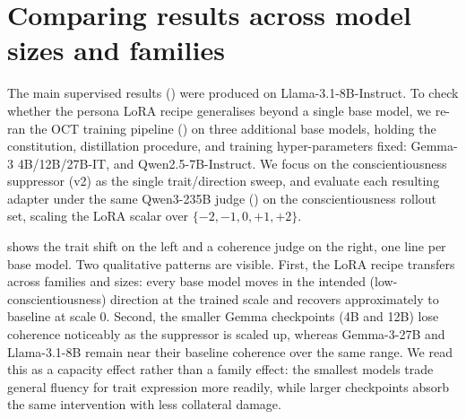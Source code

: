 \section{Comparing results across model sizes and families}\label{sec:appendix-cross-model}

The main supervised results () were produced on Llama-3.1-8B-Instruct. To check whether the persona LoRA recipe generalises beyond a single base model, we re-ran the OCT training pipeline () on three additional base models, holding the constitution, distillation procedure, and training hyper-parameters fixed: Gemma-3 4B/12B/27B-IT, and Qwen2.5-7B-Instruct.
We focus on the conscientiousness suppressor (v2) as the single trait/direction sweep, and evaluate each resulting adapter under the same Qwen3-235B judge () on the conscientiousness rollout set, scaling the LoRA scalar over $\{-2, -1, 0, +1, +2\}$.

 shows the trait shift on the left and a coherence judge on the right, one line per base model. Two qualitative patterns are visible.
First, the LoRA recipe transfers across families and sizes: every base model moves in the intended (low-conscientiousness) direction at the trained scale and recovers approximately to baseline at scale $0$.
Second, the smaller Gemma checkpoints (4B and 12B) lose coherence noticeably as the suppressor is scaled up, whereas Gemma-3-27B and Llama-3.1-8B remain near their baseline coherence over the same range. We read this as a capacity effect rather than a family effect: the smallest models trade general fluency for trait expression more readily, while larger checkpoints absorb the same intervention with less collateral damage.

